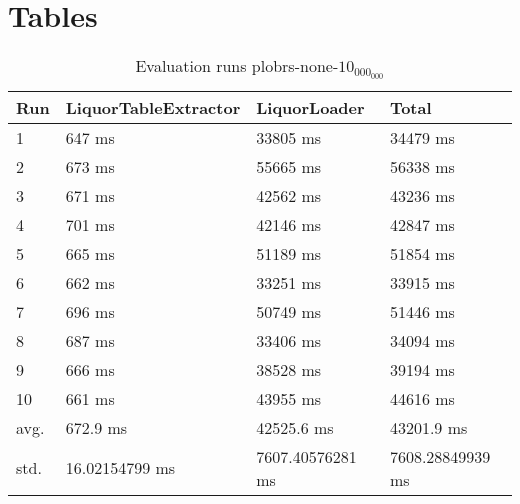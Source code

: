 \section{Tables}
\label{appendix:example1}
\begin{table}[ht]
	\caption{Evaluation runs plobrs-none-$10_000_000$}
	\label{outdated:tab:eval:plobrs-none-10_000_000}
	\begin{tabular}{|l|l|l|l|}
		\hline
		Run  & LiquorTableExtractor & LiquorLoader     & Total            \\
		\hline
		1    & 647 ms               & 33805 ms         & 34479 ms         \\
		2    & 673 ms               & 55665 ms         & 56338 ms         \\
		3    & 671 ms               & 42562 ms         & 43236 ms         \\
		4    & 701 ms               & 42146 ms         & 42847 ms         \\
		5    & 665 ms               & 51189 ms         & 51854 ms         \\
		6    & 662 ms               & 33251 ms         & 33915 ms         \\
		7    & 696 ms               & 50749 ms         & 51446 ms         \\
		8    & 687 ms               & 33406 ms         & 34094 ms         \\
		9    & 666 ms               & 38528 ms         & 39194 ms         \\
		10   & 661 ms               & 43955 ms         & 44616 ms         \\
		\hline
		avg. & 672.9 ms             & 42525.6 ms       & 43201.9 ms       \\
		std. & 16.02154799 ms       & 7607.40576281 ms & 7608.28849939 ms \\
		\hline
	\end{tabular}
\end{table}
